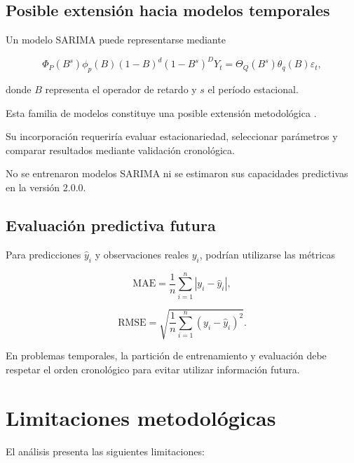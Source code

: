 \documentclass[11pt,a4paper]{article}
\begin{document}
\subsection{Posible extensión hacia modelos temporales}

Un modelo SARIMA puede representarse mediante

\[
\Phi_P(B^s)\phi_p(B)
(1-B)^d(1-B^s)^D Y_t
=
\Theta_Q(B^s)\theta_q(B)\varepsilon_t,
\]

donde $B$ representa el operador de retardo
y $s$ el período estacional.

Esta familia de modelos constituye una posible
extensión metodológica \cite{hyndman2021}.

Su incorporación requeriría evaluar estacionariedad,
seleccionar parámetros y comparar resultados
mediante validación cronológica.

No se entrenaron modelos SARIMA ni se estimaron
sus capacidades predictivas en la versión 2.0.0.

\subsection{Evaluación predictiva futura}

Para predicciones $\widehat{y}_i$ y observaciones
reales $y_i$, podrían utilizarse las métricas

\[
\mathrm{MAE}=
\frac{1}{n}\sum_{i=1}^{n}
|y_i-\widehat{y}_i|,
\]

\[
\mathrm{RMSE}=
\sqrt{
\frac{1}{n}
\sum_{i=1}^{n}
(y_i-\widehat{y}_i)^2
}.
\]

En problemas temporales, la partición de entrenamiento
y evaluación debe respetar el orden cronológico
para evitar utilizar información futura.


\section{Limitaciones metodológicas}

El análisis presenta las siguientes limitaciones:
\end{document}
